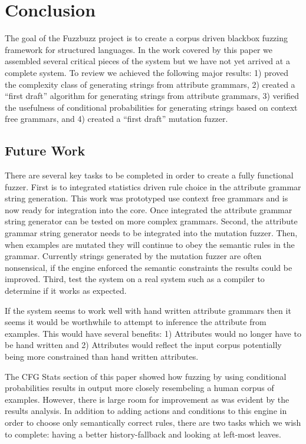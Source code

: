\section{Conclusion}

The goal of the Fuzzbuzz project is to create a corpus driven blackbox fuzzing
framework for structured languages. In the work covered by this paper we
assembled several critical pieces of the system but we have not yet arrived at a
complete system. To review we achieved the following major results: 1) proved
the complexity class of generating strings from attribute grammars, 2) created a
``first draft'' algorithm for generating strings from attribute grammars, 3)
verified the usefulness of conditional probabilities for generating strings
based on context free grammars, and 4) created a ``first draft'' mutation
fuzzer.

\subsection{Future Work}

There are several key tasks to be completed in order to create a fully
functional fuzzer. First is to integrated statistics driven rule choice in
the attribute grammar string generation. This work was prototyped use context
free grammars and is now ready for integration into the core. Once integrated
the attribute grammar string generator can be tested on more complex grammars.
Second, the attribute grammar string generator needs to be integrated into the
mutation fuzzer. Then, when examples are mutated they will continue to obey the
semantic rules in the grammar. Currently strings generated by the mutation
fuzzer are often nonsensical, if the engine enforced the semantic constraints
the results could be improved. Third, test the system on a real system such as a
compiler to determine if it works as expected.

If the system seems to work well with hand written attribute grammars then it
seems it would be worthwhile to attempt to inference the attribute from
examples. This would have several benefits: 1) Attributes would no longer have
to be hand written and 2) Attributes would reflect the input corpus potentially
being more constrained than hand written attributes.

The CFG Stats section of this paper showed how fuzzing by using conditional
probabilities results in output more closely resembeling a human corpus of
examples. However, there is large room for improvement as was evident by the
results analysis. In addition to adding actions and conditions to this engine
in order to choose only semantically correct rules, there are two tasks which
we wish to complete: having a better history-fallback and looking at left-most
leaves.

